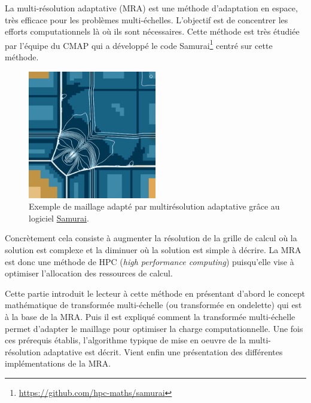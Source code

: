 

La multi-résolution adaptative (MRA) est une méthode d'adaptation en espace, très efficace pour les problèmes multi-échelles.
L'objectif est de concentrer les efforts computationnels là où ils sont nécessaires. 
Cette méthode est très étudiée par l'équipe du CMAP qui a développé le code Samurai\footnote{\href{https://github.com/hpc-maths/samurai}{https://github.com/hpc-maths/samurai}}
centré sur cette méthode.
\begin{figure}[h]
    \centering
    \includegraphics[width=0.5\textwidth]{media/3_/3_/exemple_compression_samurai.png}
    \caption{Exemple de maillage adapté par multirésolution adaptative grâce au logiciel \href{https://github.com/hpc-maths/samurai}{Samurai}.}
    \label{fig:samurai}
\end{figure}
Concrètement cela consiste à augmenter la résolution de la grille de calcul où la solution est complexe et la diminuer où la solution est simple à décrire.
La MRA est donc une méthode de HPC (\textit{high performance computing}) puisqu'elle vise à optimiser l'allocation des ressources de calcul.\par
Cette partie introduit le lecteur à cette méthode en présentant d'abord le concept mathématique de transformée multi-échelle (ou transformée en ondelette)
qui est à la base de la MRA. 
Puis il est expliqué comment la transformée multi-échelle permet d'adapter le maillage pour optimiser la charge computationnelle.
Une fois ces prérequis établis, l'algorithme typique de mise en oeuvre de la multi-résolution adaptative est décrit.
Vient enfin une présentation des différentes implémentations de la MRA.

